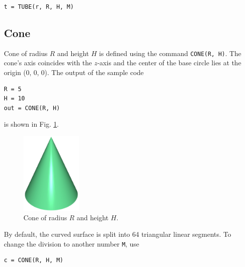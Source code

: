 \begin{bbox}
\begin{verbatim}
t = TUBE(r, R, H, M)
\end{verbatim}
\end{bbox}
\vspace{6mm}

\noindent

\subsection{Cone}\label{par:coco}

Cone of radius $R$ and height $H$ is defined using the command 
{\tt CONE(R, H)}. The cone's axis coincides with the $z$-axis and 
the center of the base circle lies at the origin (0, 0, 0).
The output of the sample code\\

\begin{bbox}
\begin{verbatim}
R = 5
H = 10
out = CONE(R, H)
\end{verbatim}
\end{bbox}
\vspace{6mm}

\noindent
is shown in Fig. \ref{fig:convexhull-2a}.
\newpage

\begin{figure}[!ht]
\begin{center}
\includegraphics[width=0.27\textwidth]{img/convexhull-2.png}
\end{center}
\vspace{-4mm}
\caption{Cone of radius $R$ and height $H$.}
\label{fig:convexhull-2a}
\end{figure}
\noindent
By default, the curved surface is split into 64 triangular linear segments. To 
change the division to another number {\tt M}, use\\

\begin{bbox}
\begin{verbatim}
c = CONE(R, H, M)
\end{verbatim}
\end{bbox}
\vspace{6mm}

